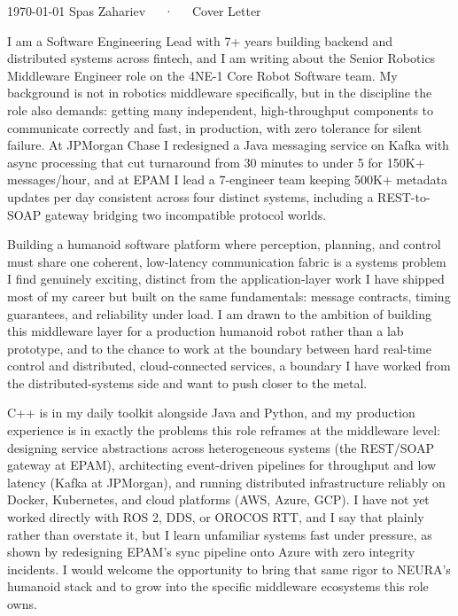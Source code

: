 \documentclass[11pt, a4paper]{awesome-cv}
\begin{document}
\makecvheader[R]

\makecvfooter
  {\today}
  {Spas Zahariev~~~·~~~Cover Letter}
  {}

\makelettertitle

\begin{cvletter}

I am a Software Engineering Lead with 7+ years building backend and distributed systems across fintech, and I am writing about the Senior Robotics Middleware Engineer role on the 4NE-1 Core Robot Software team. My background is not in robotics middleware specifically, but in the discipline the role also demands: getting many independent, high-throughput components to communicate correctly and fast, in production, with zero tolerance for silent failure. At JPMorgan Chase I redesigned a Java messaging service on Kafka with async processing that cut turnaround from 30 minutes to under 5 for 150K+ messages/hour, and at EPAM I lead a 7-engineer team keeping 500K+ metadata updates per day consistent across four distinct systems, including a REST-to-SOAP gateway bridging two incompatible protocol worlds.

Building a humanoid software platform where perception, planning, and control must share one coherent, low-latency communication fabric is a systems problem I find genuinely exciting, distinct from the application-layer work I have shipped most of my career but built on the same fundamentals: message contracts, timing guarantees, and reliability under load. I am drawn to the ambition of building this middleware layer for a production humanoid robot rather than a lab prototype, and to the chance to work at the boundary between hard real-time control and distributed, cloud-connected services, a boundary I have worked from the distributed-systems side and want to push closer to the metal.

C++ is in my daily toolkit alongside Java and Python, and my production experience is in exactly the problems this role reframes at the middleware level: designing service abstractions across heterogeneous systems (the REST/SOAP gateway at EPAM), architecting event-driven pipelines for throughput and low latency (Kafka at JPMorgan), and running distributed infrastructure reliably on Docker, Kubernetes, and cloud platforms (AWS, Azure, GCP). I have not yet worked directly with ROS 2, DDS, or OROCOS RTT, and I say that plainly rather than overstate it, but I learn unfamiliar systems fast under pressure, as shown by redesigning EPAM's sync pipeline onto Azure with zero integrity incidents. I would welcome the opportunity to bring that same rigor to NEURA's humanoid stack and to grow into the specific middleware ecosystems this role owns.

\end{cvletter}


\makeletterclosing
\end{document}
